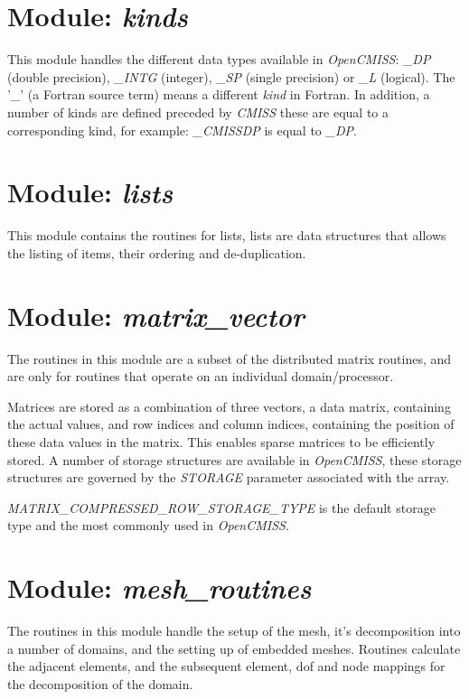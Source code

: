 \section{Module: \emph{kinds}}
\label{sec:kinds}

This module handles the different data types available in \emph{OpenCMISS}: 
\emph{\_DP} (double precision), \emph{\_INTG} (integer), \emph{\_SP} (single 
precision) or \emph{\_L} (logical). The '\emph{\_}' (a Fortran source term) 
means a different \emph{kind} in Fortran. In addition, a number of kinds 
are defined preceded by \emph{CMISS} these are equal to a corresponding 
kind, for example: \emph{\_CMISSDP} is equal to \emph{\_DP}. 


\section{Module: \emph{lists}}
\label{sec:lists}

This module contains the routines for lists, lists are data structures that 
allows the listing of items, their ordering and de-duplication.


\section{Module: \emph{matrix\_vector}}
\label{sec:matrixvector}

The routines in this module are a subset of the distributed matrix routines, 
and are only for routines that operate on an individual domain/processor.

Matrices are stored as a combination of three vectors, a data matrix, 
containing the actual values, and row indices and column indices, containing 
the position of these data values in the matrix. This enables sparse matrices 
to be efficiently stored. A number of storage structures are available in 
\emph{OpenCMISS}, these storage structures are governed by the \emph{STORAGE} 
parameter associated with the array. 

\emph{MATRIX\_COMPRESSED\_ROW\_STORAGE\_TYPE} is the default storage type 
and the most commonly used in \emph{OpenCMISS}.


\section{Module: \emph{mesh\_routines}}
\label{sec:meshroutines}

The routines in this module handle the setup of the mesh, it's decomposition 
into a number of domains, and the setting up of embedded meshes. Routines 
calculate the adjacent elements, and the subsequent element, dof and node 
mappings for the decomposition of the domain.

